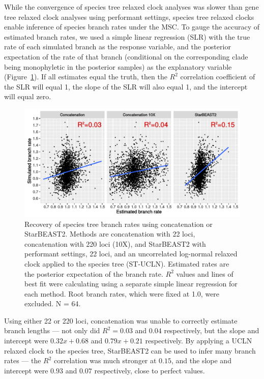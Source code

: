 \documentclass[12pt]{article}
\begin{document}
While the convergence of species tree relaxed clock analyses was slower than
gene tree relaxed clock analyses using performant settings, species tree relaxed
clocks enable inference of species branch rates under the MSC. To gauge the
accuracy of estimated branch rates, we used a simple linear regression (SLR)
with the true rate of each simulated branch as the response variable, and the
posterior expectation of the rate of that branch (conditional on the
corresponding clade being monophyletic in the posterior samples) as the
explanatory variable (Figure~\ref{fig:branchRatesLM}). If all estimates equal
the truth, then the $R^2$ correlation coefficient of the SLR will equal 1, the
slope of the SLR will also equal 1, and the intercept will equal zero.

\begin{figure}[htb!]
\centering
\includegraphics[width=16cm]{branch_rates.pdf}
\caption
{Recovery of species tree branch rates using concatenation or StarBEAST2.
Methods are concatenation with 22 loci, concatenation with 220 loci (10X), and
StarBEAST2 with performant settings, 22 loci, and an uncorrelated log-normal
relaxed clock applied to the species tree (ST-UCLN). Estimated rates are the
posterior expectation of the branch rate. $R^2$ values and lines of best fit were calculating using a separate
simple linear regression for each method. Root branch rates, which were fixed at
1.0, were excluded. N = 64.}
\label{fig:branchRatesLM}
\end{figure}

Using either 22 or 220 loci, concatenation was unable to correctly estimate
branch lengths --- not only did $R^2 = 0.03$ and $0.04$ respectively, but the
slope and intercept were $0.32x + 0.68$ and $0.79x + 0.21$ respectively. By
applying a UCLN relaxed clock to the species tree, StarBEAST2 can be used to
infer many branch rates --- the $R^2$ correlation was much stronger at $0.15$,
and the slope and intercept were $0.93$ and $0.07$ respectively, close to
perfect values.
\end{document}
